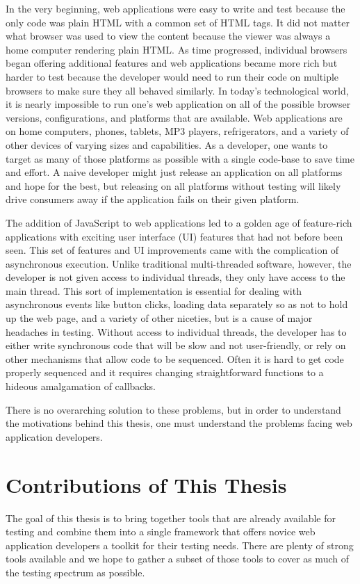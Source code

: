 \documentclass[12pt]{ucthesis}
\begin{document}
In the very beginning, web applications were easy to write and test because the only code was plain HTML with a common set of HTML tags. It did not matter what browser was used to view the content because the viewer was always a home computer rendering plain HTML. As time progressed, individual browsers began offering additional features and web applications became more rich but harder to test because the developer would need to run their code on multiple browsers to make sure they all behaved similarly. In today's technological world, it is nearly impossible to run one's web application on all of the possible browser versions, configurations, and platforms that are available. Web applications are on home computers, phones, tablets, MP3 players, refrigerators\cite{SamsungFridge}, and a variety of other devices of varying sizes and capabilities. As a developer, one wants to target as many of those platforms as possible with a single code-base to save time and effort. A naive developer might just release an application on all platforms and hope for the best, but releasing on all platforms without testing will likely drive consumers away if the application fails on their given platform.

The addition of JavaScript to web applications led to a golden age of feature-rich applications with exciting user interface (UI) features that had not before been seen. This set of features and UI improvements came with the complication of asynchronous execution. Unlike traditional multi-threaded software, however, the developer is not given access to individual threads, they only have access to the main thread. This sort of implementation is essential for dealing with asynchronous events like button clicks, loading data separately so as not to hold up the web page, and a variety of other niceties, but is a cause of major headaches in testing. Without access to individual threads, the developer has to either write synchronous code that will be slow and not user-friendly, or rely on other mechanisms that allow code to be sequenced. Often it is hard to get code properly sequenced and it requires changing straightforward functions to a hideous amalgamation of callbacks.

There is no overarching solution to these problems, but in order to understand the motivations behind this thesis, one must understand the problems facing web application developers.

\section{Contributions of This Thesis}
The goal of this thesis is to bring together tools that are already available for testing and combine them into a single framework that offers novice web application developers a toolkit for their testing needs. There are plenty of strong tools available and we hope to gather a subset of those tools to cover as much of the testing spectrum as possible. 
\end{document}
